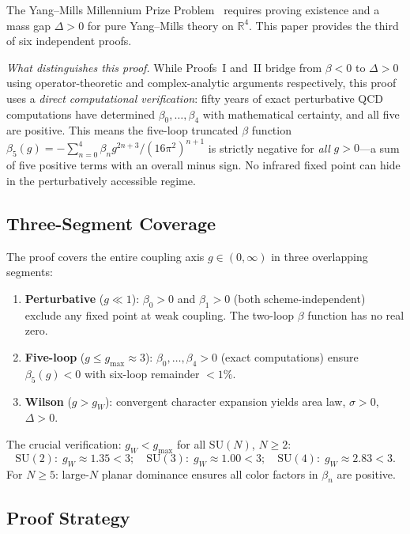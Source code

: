 \documentclass[12pt,a4paper]{article}
\theoremstyle{plain}
\theoremstyle{definition}
\theoremstyle{remark}
\begin{document}
The Yang--Mills Millennium Prize Problem~\cite{JaffeWitten2000} requires proving existence and a mass gap $\Delta>0$ for pure Yang--Mills theory on $\mathbb{R}^4$. This paper provides the third of six independent proofs.

\textit{What distinguishes this proof.} While Proofs~I and~II bridge from $\beta<0$ to $\Delta>0$ using operator-theoretic and complex-analytic arguments respectively, this proof uses a \emph{direct computational verification}: fifty years of exact perturbative QCD computations have determined $\beta_0,\ldots,\beta_4$ with mathematical certainty, and all five are positive. This means the five-loop truncated $\beta$ function $\beta_5(g)=-\sum_{n=0}^4 \beta_n g^{2n+3}/(16\pi^2)^{n+1}$ is strictly negative for \emph{all} $g>0$---a sum of five positive terms with an overall minus sign. No infrared fixed point can hide in the perturbatively accessible regime.

\subsection{Three-Segment Coverage}\label{sec:three}

The proof covers the entire coupling axis $g\in(0,\infty)$ in three overlapping segments:

\begin{enumerate}[label=\textbf{Segment \Roman*},leftmargin=4em]
\item \textbf{Perturbative} ($g\ll 1$): $\beta_0>0$ and $\beta_1>0$ (both scheme-independent) exclude any fixed point at weak coupling. The two-loop $\beta$ function has no real zero.
\item \textbf{Five-loop} ($g\leq g_{\max}\approx 3$): $\beta_0,\ldots,\beta_4>0$ (exact computations) ensure $\beta_5(g)<0$ with six-loop remainder $<1\%$.
\item \textbf{Wilson} ($g>g_W$): convergent character expansion yields area law, $\sigma>0$, $\Delta>0$.
\end{enumerate}

The crucial verification: $g_W<g_{\max}$ for all $\mathrm{SU}(N)$, $N\geq 2$:
\begin{equation}\label{eq:overlap}
\mathrm{SU}(2):\;g_W\approx 1.35<3;\quad
\mathrm{SU}(3):\;g_W\approx 1.00<3;\quad
\mathrm{SU}(4):\;g_W\approx 2.83<3.
\end{equation}
For $N\geq 5$: large-$N$ planar dominance ensures all color factors in $\beta_n$ are positive.

\subsection{Proof Strategy}\label{sec:strategy}
\end{document}

